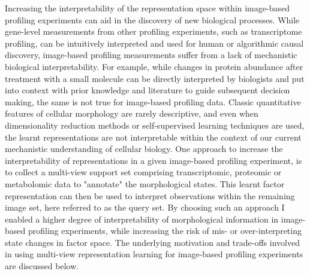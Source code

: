 \begin{flushleft}
Increasing the interpretability of the representation space within image-based profiling experiments can aid in the discovery of new biological processes. While gene-level measurements from other profiling experiments, such as transcriptome profiling, can be intuitively interpreted and used for human or algorithmic causal discovery, image-based profiling measurements suffer from a lack of mechanistic biological interpretability. For example, while changes in protein abundance after treatment with a small molecule can be directly interpreted by biologists and put into context with prior knowledge and literature to guide subsequent decision making, the same is not true for image-based profiling data. Classic quantitative features of cellular morphology are rarely descriptive, and even when dimensionality reduction methods or self-supervised learning techniques are used, the learnt representations are not interpretable within the context of our current mechanistic understanding of cellular biology. One approach to increase the interpretability of representations in a given image-based profiling experiment, is to collect a multi-view support set comprising transcriptomic, proteomic or metabolomic data to "annotate" the morphological states. This learnt factor representation can then be used to interpret observations within the remaining image set, here referred to as the query set. By choosing such an approach I enabled a higher degree of interpretability of morphological information in image-based profiling experiments, while increasing the risk of mis- or over-interpreting state changes in factor space. The underlying motivation and trade-offs involved in using multi-view representation learning for image-based profiling experiments are discussed below. 
\bigbreak


\end{flushleft}
